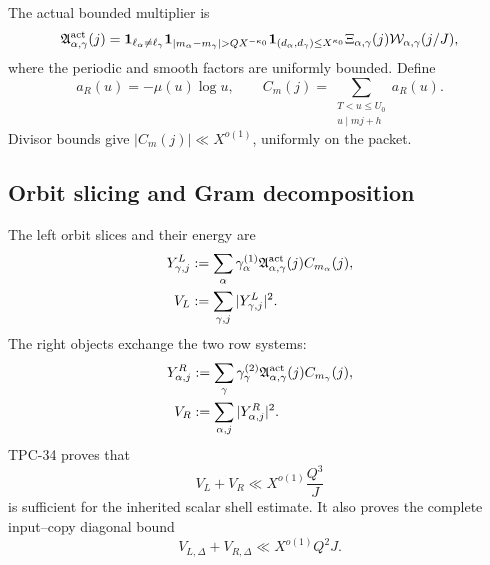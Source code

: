 The actual bounded multiplier is
\begin{equation}
 \mathfrak A_{\alpha,\gamma}^{\rm act}(j)
 =\one_{\ell_\alpha\ne\ell_\gamma}
  \one_{|m_\alpha-m_\gamma|>QX^{-\kappa_0}}
  \one_{(d_\alpha,d_\gamma)\le X^{\kappa_0}}
  \Xi_{\alpha,\gamma}(j)\cW_{\alpha,\gamma}(j/J),
 \label{eq:tpc35-actual-multiplier}
\end{equation}
where the periodic and smooth factors are uniformly bounded.  Define
\begin{equation}
 a_R(u)=-\mu(u)\log u,\qquad
 C_m(j)=\sum_{\substack{T<u\le U_0\\u\mid mj+h}}a_R(u).
 \label{eq:tpc35-ultra-increment}
\end{equation}
Divisor bounds give \( |C_m(j)|\ll X^{o(1)}\), uniformly on the packet.

\subsection{Orbit slicing and Gram decomposition}

The left orbit slices and their energy are
\begin{align}
 Y_{\gamma,j}^L
 &:=\sum_\alpha\gamma_\alpha^{(1)}
 \mathfrak A_{\alpha,\gamma}^{\rm act}(j)C_{m_\alpha}(j),
 \label{eq:tpc35-left-slice}\\
 V_L&:=\sum_{\gamma,j}|Y_{\gamma,j}^L|^2.
 \label{eq:tpc35-left-energy}
\end{align}
The right objects exchange the two row systems:
\begin{align}
 Y_{\alpha,j}^R
 &:=\sum_\gamma\gamma_\gamma^{(2)}
 \mathfrak A_{\alpha,\gamma}^{\rm act}(j)C_{m_\gamma}(j),
 \label{eq:tpc35-right-slice}\\
 V_R&:=\sum_{\alpha,j}|Y_{\alpha,j}^R|^2.
 \label{eq:tpc35-right-energy}
\end{align}
TPC-34 proves that
\begin{equation}
 V_L+V_R\ll X^{o(1)}\frac{Q^3}{J}
 \label{eq:tpc35-orbit-gate}
\end{equation}
is sufficient for the inherited scalar shell estimate.  It also proves
the complete input--copy diagonal bound
\begin{equation}
 V_{L,\Delta}+V_{R,\Delta}\ll X^{o(1)}Q^2J.
 \label{eq:tpc35-orbit-diagonal}
\end{equation}

